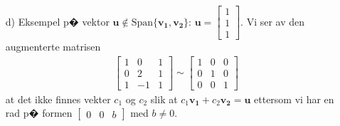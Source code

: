 \documentclass[a4paper, norsk, 12pt]{extarticle}
\begin{document}
\begin{itemize}
\item[d)]
Eksempel p� vektor $\mathbf{u} \notin \text{Span} \{\mathbf{v_1}, \mathbf{v_2}\}$: $\mathbf{u} = \begin{bmatrix} 1 \\ 1 \\ 1 \end{bmatrix}$. Vi ser av den augmenterte matrisen
\begin{align*}
\begin{bmatrix} 1 & 0 & 1 \\ 0 & 2 & 1 \\ 1 & -1 & 1 \end{bmatrix} \sim \begin{bmatrix} 1 & 0 & 0 \\ 0 & 1 & 0 \\ 0 & 0 & 1 \end{bmatrix}
\end{align*}
at det ikke finnes vekter $c_1$ og $c_2$ slik at $c_1 \mathbf{v_1} + c_2 \mathbf{v_2} = \mathbf{u} $
ettersom vi har en rad p� formen $\begin{bmatrix} 0 & 0 & b \end{bmatrix} $ med $b \neq 0$.
\end{itemize}

\section{}
\end{document}
